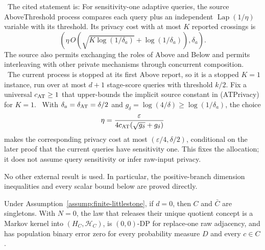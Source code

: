 \noindent \ The cited statement is: For sensitivity-one adaptive queries, the source
  AboveThreshold process compares each query plus an independent
  \(\operatorname{Lap}(1/\eta)\) variable with its threshold. Its privacy
  cost with at most \(K\) reported crossings is
  \[
  \left(
  \eta\,O\!\left(\sqrt{K\log(1/\delta_a)}
       +\log(1/\delta_a)\right),\delta_a
  \right).
  \tag{ATPrivacy}
  \]
  The source also permits exchanging the roles of Above and Below and permits
  interleaving with other private mechanisms through concurrent composition.
\noindent \  The current process is stopped at its first Above report,
  so it is a stopped \(K=1\) instance, run over at most \(d+1\) stage-score
  queries with threshold \(k/2\). Fix a universal \(c_{\rm AT}\ge1\) that
  upper-bounds the implicit source constant in (ATPrivacy) for \(K=1\).
\noindent \  With
  \(\delta_a=\delta_{\rm AT}=\delta/2\) and
  \(g_\delta=\log(4/\delta)\ge\log(1/\delta_a)\), the choice
  \[
  \eta=\frac{\varepsilon}
  {4c_{\rm AT}(\sqrt{g_\delta}+g_\delta)}
  \]
  makes the corresponding privacy cost at most
  \((\varepsilon/4,\delta/2)\), conditional on the later proof that the
  current queries have sensitivity one. This fixes the allocation;
  it does not assume query sensitivity or infer raw-input privacy.

No other external result is used. In particular, the positive-branch
dimension inequalities and every scalar bound below are proved directly.



\begin{proposition}\label{prop:step-001-zero}
Under Assumption~\ref{assump:finite-littlestone}, if \(d=0\), then \(C\)
and \(\bar C\) are singletons. With \(N=0\), the law that releases their
unique quotient concept is a Markov kernel into \((H_C,\mathcal H_C)\), is
\((0,0)\)-DP for replace-one raw adjacency, and has population binary error
zero for every probability measure \(D\) and every \(c\in C\).


\end{proposition}

